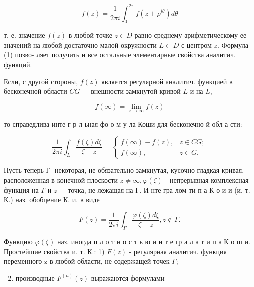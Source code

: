 \documentclass[10pt]{article}
\begin{document}
\[

f(z)=\frac{1}{2 \pi i} \int_{0}^{2 \pi} f\left(z+\rho^{i \theta}\right) d \theta

\]



т. е. значение $f(z)$ в любой точке $z \in D$ равно среднему арифметическому ее значений на любой достаточно малой окружности $L \subset D$ с центром $z$. Формула (1) позво- ляет получить и все остальные элементарные свойства аналитич. функций.



Если, с другой стороны, $f(z)$ является регулярной аналитич. функцией в бесконечной области $C \bar{G}-$ внешности замкнутой кривой $L$ и на $L$,



\[

f(\infty)=\lim _{z \rightarrow \infty} f(z)

\]



то справедлива инте г р л ьная фо о м у ла Коши для бесконечно й обл а сти:



\[

\frac{1}{2 \pi i} \int_{L} \frac{f(\zeta) d \zeta}{\zeta-z}= \begin{cases}f(\infty)-f(z), & z \in C \bar{G} ; \\ f(\infty), & z \in G .\end{cases}

\]



Пусть теперь Г- некоторая, не обязательно замкнутая, кусочно гладкая кривая, расположенная в конечной плоскости $z \neq \infty, \varphi(\zeta)$ - непрерывная комплексная функция на $\Gamma$ и $z-$ точка, не лежащая на $Г$. И нте гра лом ти п а К о и и (и. т. К.) наз. обобцение К. и. в виде



\[

F(z)=\frac{1}{2 \pi i} \int_{\Gamma} \frac{\varphi(\zeta) d \xi}{\zeta-z}, z \notin \Gamma .

\]



Функцию $\varphi(\zeta)$ наз. иногда п л о т н о с т ь ю и н т е гр а л а т и п а К о ш и. Простейшие свойства и. т. К.: 1) $F(z)$ - регулярная аналитич. функция переменного z в любой области, не содержащей точек $\Gamma$;



\begin{enumerate}

  \setcounter{enumi}{1}

  \item производные $F^{(n)}(z)$ выражаются формулами

\end{enumerate}
\end{document}
